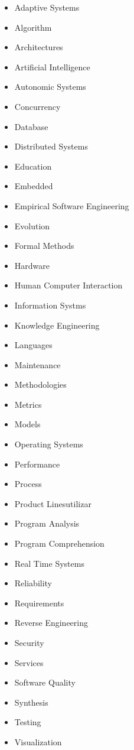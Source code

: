 \begin{multicols}{4}
  \begin{itemize}
  \item Adaptive Systems
  \item Algorithm
  \item Architectures
  \item Artificial Intelligence
  \item Autonomic Systems
  \item Concurrency
  \item Database
  \item Distributed Systems
  \item Education
  \item Embedded
  \item Empirical Software Engineering
  \item Evolution
  \item Formal Methods
  \item Hardware
  \item Human Computer Interaction
  \item Information Systms
  \item Knowledge Engineering
  \item Languages
  \item Maintenance
  \item Methodologies
  \item Metrics
  \item Models
  \item Operating Systems
  \item Performance
  \item Process
  \item Product Linesutilizar
  \item Program Analysis
  \item Program Comprehension
  \item Real Time Systems
  \item Reliability
  \item Requirements
  \item Reverse Engineering
  \item Security
  \item Services
  \item Software Quality
  \item Synthesis
  \item Testing
  \item Visualization
  \end{itemize}
  \label{int:tblTopicos}
\end{multicols}
